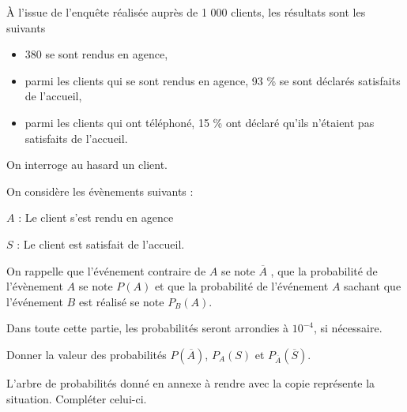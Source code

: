 \documentclass[a4paper,12pt]{scrartcl}
\begin{document}
À l'issue de l'enquête réalisée auprès de 1 000 clients, les résultats sont les suivants

\begin{itemize}
\item 380 se sont rendus en agence,
\item parmi les clients qui se sont rendus en agence, 93 \% se sont déclarés satisfaits de l'accueil,
\item parmi les clients qui ont téléphoné, 15 \% ont déclaré qu'ils n'étaient pas satisfaits de l'accueil.
\end{itemize}

On interroge au hasard un client.

On considère les évènements suivants :

$A$ : \og{}Le client s'est rendu en agence\fg{}

$S$ : \og{}Le client est satisfait de l'accueil\fg{}.

On rappelle que l'événement contraire de $A$ se note $\overline{A}$ , que la probabilité de l'évènement $A$ se note $P(A)$ et que la probabilité de l'événement $A$ sachant que l'événement $B$ est réalisé se note $P_B(A)$.

Dans toute cette partie, les probabilités seront arrondies à $10^{-4}$, si nécessaire.

\question{}
Donner la valeur des probabilités $P\left(\overline{A}\right)$, $P_A(S)$ et $P_{\overline{A}} \left(\overline{S}\right)$.



\question{}
L'arbre de probabilités donné en annexe à rendre avec la copie représente la situation. Compléter celui-ci.

\end{document}
